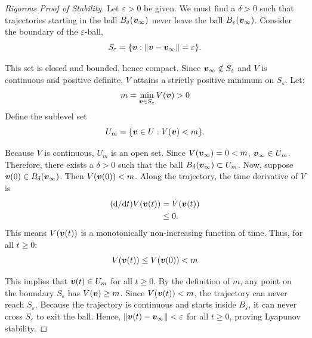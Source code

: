\begin{proof}[Rigorous Proof of Stability]
Let $\varepsilon > 0$ be given. We must find a $\delta > 0$ such that trajectories starting in the ball $B_\delta(\bm{v}_\infty)$ never leave the ball $B_\varepsilon(\bm{v}_\infty)$.
Consider the boundary of the $\varepsilon$-ball,
\[
S_\varepsilon = \{ \bm{v} : \|\bm{v} - \bm{v}_\infty\| = \varepsilon \}.
\]

This set is closed and bounded, hence compact. Since $\bm{v}_\infty \notin S_\varepsilon$ and $V$ is continuous and positive definite, $V$ attains a strictly positive minimum on $S_\varepsilon$. Let:
\begin{equation}
m = \min_{\bm{v} \in S_\varepsilon} V(\bm{v}) > 0
\end{equation}
Define the sublevel set
\[
U_m = \{ \bm{v} \in U : V(\bm{v}) < m \}.
\]

Because $V$ is continuous, $U_m$ is an open set. Since $V(\bm{v}_\infty) = 0 < m$, $\bm{v}_\infty \in U_m$. Therefore, there exists a $\delta > 0$ such that the ball $B_\delta(\bm{v}_\infty) \subset U_m$.
Now, suppose $\bm{v}(0) \in B_\delta(\bm{v}_\infty)$. Then $V(\bm{v}(0)) < m$.
Along the trajectory, the time derivative of $V$ is
\[
\begin{aligned}
(\mathrm{d}/\mathrm{d} t) V(\bm{v}(t)) &= \dot{V}(\bm{v}(t)) \\
&\leq 0.
\end{aligned}
\]
This means $V(\bm{v}(t))$ is a monotonically non-increasing function of time. Thus, for all $t \geq 0$:
\begin{equation}
V(\bm{v}(t)) \leq V(\bm{v}(0)) < m
\end{equation}

This implies that $\bm{v}(t) \in U_m$ for all $t \geq 0$. By the definition of $m$, any point on the boundary $S_\varepsilon$ has $V(\bm{v}) \geq m$. Since $V(\bm{v}(t)) < m$, the trajectory can never reach $S_\varepsilon$. Because the trajectory is continuous and starts inside $B_\varepsilon$, it can never cross $S_\varepsilon$ to exit the ball. Hence, $\|\bm{v}(t) - \bm{v}_\infty\| < \varepsilon$ for all $t \geq 0$, proving Lyapunov stability.
\end{proof}

